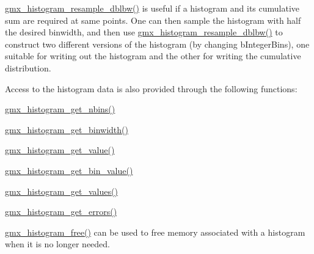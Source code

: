 \hyperlink{include_2histogram_8h_a93a4debed53d9956228209842abfce40}{gmx\-\_\-histogram\-\_\-resample\-\_\-dblbw()} is useful if a histogram and its cumulative sum are required at same points. \-One can then sample the histogram with half the desired binwidth, and then use \hyperlink{include_2histogram_8h_a93a4debed53d9956228209842abfce40}{gmx\-\_\-histogram\-\_\-resample\-\_\-dblbw()} to construct two different versions of the histogram (by changing {\ttfamily b\-Integer\-Bins}), one suitable for writing out the histogram and the other for writing the cumulative distribution.

\-Access to the histogram data is also provided through the following functions\-:
\begin{DoxyItemize}
\item \hyperlink{include_2histogram_8h_af81328f5edef6cd281f884e26845076f}{gmx\-\_\-histogram\-\_\-get\-\_\-nbins()}
\item \hyperlink{include_2histogram_8h_aff30dc93f050ce11d3e7145072b8a4b3}{gmx\-\_\-histogram\-\_\-get\-\_\-binwidth()}
\item \hyperlink{include_2histogram_8h_a928f4b4ec02cc83d6c46cb220f2d2d20}{gmx\-\_\-histogram\-\_\-get\-\_\-value()}
\item \hyperlink{include_2histogram_8h_a7351630f6fb7293a74c35feec7fe3162}{gmx\-\_\-histogram\-\_\-get\-\_\-bin\-\_\-value()}
\item \hyperlink{include_2histogram_8h_a5dd177892fbb17f9897917180d80e285}{gmx\-\_\-histogram\-\_\-get\-\_\-values()}
\item \hyperlink{include_2histogram_8h_a06d2724d56ff3f8a49af6d946844873e}{gmx\-\_\-histogram\-\_\-get\-\_\-errors()}
\end{DoxyItemize}

\hyperlink{include_2histogram_8h_a705814e555fa1ccb2a297903bc47a0f3}{gmx\-\_\-histogram\-\_\-free()} can be used to free memory associated with a histogram when it is no longer needed. 